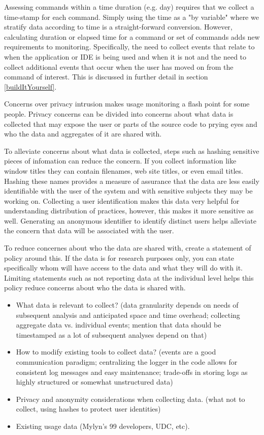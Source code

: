 Assessing commands within a time duration (e.g. day) requires that we collect a time-stamp for each command.  Simply using the time as a "by variable" where we stratify data according to time is a straight-forward conversion.  However, calculating duration or elapsed time for a command or set of commands adds new requirements to monitoring.  Specifically, the need to collect events that relate to when the application or IDE is being used and when it is not and the need to collect additional events that occur when the user has moved on from the command of interest.  This is discussed in further detail in section \ref{buildItYourself}.

Concerns over privacy intrusion makes usage monitoring a flash point for some people.  Privacy concerns can be divided into concerns about what data is collected that may expose the user or parts of the source code to prying eyes and who the data and aggregates of it are shared with.

To alleviate concerns about what data is collected, steps such as hashing sensitive pieces of infomation can reduce the concern. If you collect information like window titles they can contain filenames, web site titles, or even email titles.  Hashing these names provides a measure of assurance that the data are less easily identifiable with the user of the system and with sensitive subjects they may be working on.   Collecting a user identification makes this data very helpful for understanding distribution of practices, however, this makes it more sensitive as well.  Generating an anonymous identifier to identify distinct users helps alleviate the concern that data will be associated with the user.

To reduce concernes about who the data are shared with, create a statement of policy around this.  If the data is for research purposes only, you can state specifically whom will have access to the data and what they will do with it.  Limiting statements such as not reporting data at the individual level helps this policy reduce concerns about who the data is shared with.


    \begin{itemize}
\item
      What data is relevant to collect? (data granularity depends on needs of subsequent analysis and anticipated space and time overhead; collecting aggregate data vs. individual events; mention that data should be timestamped as a lot of subsequent analyses depend on that)
    \item
      How to modify existing tools to collect data? (events are a good communication paradigm; centralizing the logger in the code allows for consistent log messages and easy maintenance; trade-offs in storing logs as highly structured or somewhat unstructured data)
    \item
      Privacy and anonymity considerations when collecting data. (what not to collect, using hashes to protect user identities)


    \item
    	Existing usage data (Mylyn's 99 developers, UDC, etc). %

    \end{itemize}

